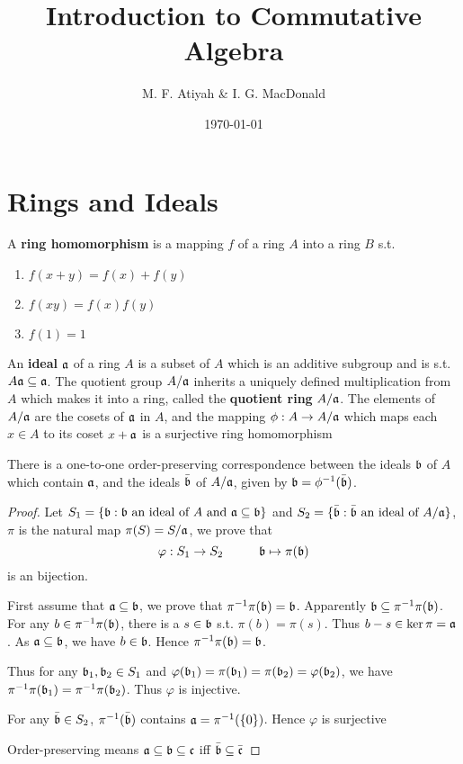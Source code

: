 \documentclass[11pt]{article}
\author{M. F. Atiyah \& I. G. MacDonald}
\date{\today}
\title{Introduction to Commutative Algebra}
\begin{document}
\maketitle
\tableofcontents


\section{Rings and Ideals}
\label{sec:orge898ff6}
A \textbf{ring homomorphism} is a mapping \(f\) of a ring \(A\) into a ring \(B\) s.t.
\begin{enumerate}
\item \(f(x+y)=f(x)+f(y)\)
\item \(f(xy)=f(x)f(y)\)
\item \(f(1)=1\)
\end{enumerate}


An \textbf{ideal} \(\mathfrak{a}\) of a ring \(A\) is a subset of \(A\) which is an additive subgroup and is
s.t. \(A\mathfrak{a}\subseteq\mathfrak{a}\). The quotient group \(A/\mathfrak{a}\) inherits a uniquely defined multiplication from \(A\)
which makes it into a ring, called the \textbf{quotient ring} \(A/\mathfrak{a}\). The elements of \(A/\mathfrak{a}\) are the
cosets of \(\mathfrak{a}\) in \(A\), and the mapping \(\phi:A\to A/\mathfrak{a}\) which maps each \(x\in A\) to its
coset \(x+\mathfrak{a}\) is a surjective ring homomorphism

\begin{proposition}[]
\label{1.1}
There is a one-to-one order-preserving correspondence between the ideals \(\mathfrak{b}\) of \(A\) which
contain \(\mathfrak{a}\), and the ideals \(\bar{\mathfrak{b}}\) of \(A/\mathfrak{a}\), given by \(\mathfrak{b}=\phi^{-1}(\bar{\mathfrak{b}})\).
\end{proposition}

\begin{proof}
Let \(S_1=\{\mathfrak{b}:\mathfrak{b}\text{ an ideal of $A$ and }\mathfrak{a}\subseteq\mathfrak{b}\}\)
and \(S_2=\{\bar{\mathfrak{b}}:\bar{\mathfrak{b}}\text{ an ideal of }A/\mathfrak{a}\}\), \(\pi\) is the natural map \(\pi(S)=S/\mathfrak{a}\), we prove that
\begin{equation*}
\varphi:S_1\to S_2\hspace{1cm}\mathfrak{b}\mapsto\pi(\mathfrak{b})
\end{equation*}
is an bijection.

First assume that \(\mathfrak{a}\subseteq\mathfrak{b}\), we prove that \(\pi^{-1}\pi(\mathfrak{b})=\mathfrak{b}\). Apparently \(\mathfrak{b}\subseteq\pi^{-1}\pi(\mathfrak{b})\). For
any \(b\in\pi^{-1}\pi(\mathfrak{b})\), there is a \(s\in\mathfrak{b}\) s.t. \(\pi(b)=\pi(s)\). Thus \(b-s\in\ker\pi=\mathfrak{a}\). As \(\mathfrak{a}\subseteq\mathfrak{b}\),
we have \(b\in\mathfrak{b}\). Hence \(\pi^{-1}\pi(\mathfrak{b})=\mathfrak{b}\).

Thus for any \(\mathfrak{b}_1,\mathfrak{b}_2\in S_1\) and \(\varphi(\mathfrak{b}_1)=\pi(\mathfrak{b}_1)=\pi(\mathfrak{b}_2)=\varphi(\mathfrak{b}_2)\), we have \(\pi^{-1}\pi(\mathfrak{b}_1)=\pi^{-1}\pi(\mathfrak{b}_2)\).
Thus \(\varphi\) is injective.

For any \(\bar{\mathfrak{b}}\in S_2\), \(\pi^{-1}(\bar{\mathfrak{b}})\) contains \(\mathfrak{a}=\pi^{-1}(\{0\})\). Hence \(\varphi\) is surjective

Order-preserving means \(\mathfrak{a}\subseteq\mathfrak{b}\subseteq\mathfrak{c}\) iff \(\bar{\mathfrak{b}}\subseteq\bar{\mathfrak{c}}\)
\end{proof}
\end{document}
